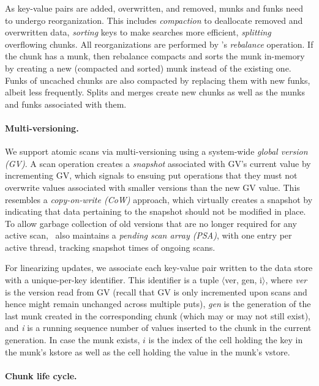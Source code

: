 As key-value pairs are added, overwritten, and removed, munks and funks need to undergo reorganization. This includes  
\emph{compaction} to deallocate removed and overwritten data, 
\emph{sorting} keys to make searches more efficient,  
\emph{splitting} overflowing chunks.
All reorganizations are performed by \sys's \emph{rebalance} operation.
If the chunk has a munk, then rebalance compacts and sorts the munk in-memory by creating a new 
(compacted and sorted) munk instead of the existing one. 
Funks of uncached chunks are also compacted by replacing them with new funks, albeit less frequently.
Splits and merges create new chunks as well as the munks and funks associated with them.

\paragraph{Multi-versioning.}

We support atomic scans via multi-versioning using a system-wide \emph{global version (GV)}. 
A scan operation creates a \emph{snapshot} associated with GV's current value by incrementing GV, 
which signals to ensuing put operations that they must not overwrite values associated with 
smaller versions than the new GV value.
This resembles a \emph{copy-on-write (CoW)} approach, which virtually creates a snapshot by 
indicating that data pertaining to the snapshot should not be modified in place.  
To allow garbage collection of old versions that are no longer required for any active scan, \sys\ also maintains 
a \emph{pending scan array (PSA)}, with one entry per active thread, tracking snapshot times of ongoing scans.

For linearizing updates, we associate each key-value pair written to the data store with a unique-per-key identifier.
This identifier is a tuple $\langle$ver, gen, i$\rangle$, where \emph{ver} is  the version read from GV 
(recall that GV is only incremented upon scans and hence might remain unchanged across multiple puts),
\emph{gen} is the generation of the last munk created in the corresponding chunk
(which may or may not still exist), 
and \emph{i} is a running sequence number of values inserted to the chunk in the current generation.
In case the munk exists, $i$ is the 
index of the cell holding the key in the munk's kstore as well as the cell holding the value in the munk's vstore. 

\paragraph{Chunk life cycle.}

